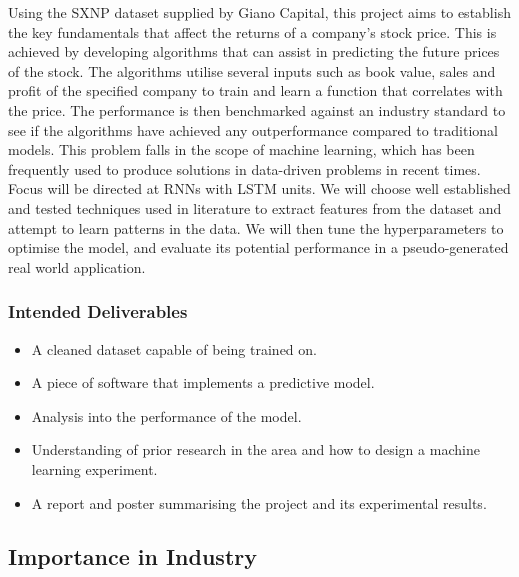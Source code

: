\documentclass[10pt,onecolumn,letterpaper]{article}
\begin{document}
Using the SXNP dataset supplied by Giano Capital, this project aims to establish the key fundamentals that affect the returns of a company's stock price. This is achieved by developing algorithms that can assist in predicting the future prices of the stock. The algorithms utilise several inputs such as book value, sales and profit of the specified company to train and learn a function that correlates with the price. The performance is then benchmarked against an industry standard to see if the algorithms have achieved any outperformance compared to traditional models. This problem falls in the scope of machine learning, which has been frequently used to produce solutions in data-driven problems in recent times. Focus will be directed at RNNs with LSTM units. We will choose well established and tested techniques used in literature to extract features from the dataset and attempt to learn patterns in the data. We will then tune the hyperparameters to optimise the model, and evaluate its potential performance in a pseudo-generated real world application. 

\subsubsection{Intended Deliverables} \label{Intended Deliverables}
\begin{itemize}
	\item A cleaned dataset capable of being trained on. 
	\item A piece of software that implements a predictive model. 
	\item Analysis into the performance of the model.
	\item Understanding of prior research in the area and how to design a machine learning experiment. 
	\item A report and poster summarising the project and its experimental results.
\end{itemize}

\subsection{Importance in Industry} 
\end{document}
